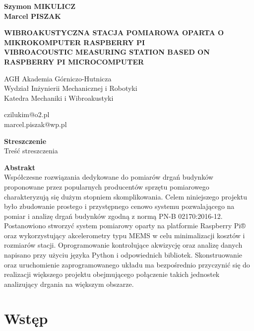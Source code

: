 \documentclass[a4paper,12pt]{mwart}
\begin{document}
\onehalfspacing
\begin{flushleft}

\textbf{Szymon \MakeUppercase{Mikulicz}} \\
\textbf{Marcel \MakeUppercase{Piszak}} \\
\vspace*{12pt}

\MakeUppercase{\textbf{Wibroakustyczna stacja pomiarowa oparta o mikrokomputer Raspberry Pi}} \\
\vspace*{6pt}
\MakeUppercase{\textbf{Vibroacoustic measuring station based on Raspberry Pi microcomputer}} \\
\vspace*{12pt}

AGH Akademia Górniczo-Hutnicza \\
Wydział Inżynierii Mechanicznej i Robotyki \\
Katedra Mechaniki i Wibroakustyki \\
\vspace*{6pt}

czilukim@o2.pl \\
marcel.piszak@wp.pl \\

\end{flushleft}

\noindent
\textbf{Streszczenie} \\
Treść streszczenia
\vspace*{24pt}

\noindent
\textbf{Abstrakt} \\
Współczesne rozwiązania dedykowane do pomiarów drgań budynków
proponowane przez popularnych producentów sprzętu pomiarowego
charakteryzują się dużym stopniem skomplikowania. Celem niniejszego
projektu było zbudowanie prostego i przystępnego cenowo systemu
pozwalającego na pomiar i analizę drgań budynków zgodną z normą PN-B
02170:2016-12. Postanowiono stworzyć system pomiarowy oparty na
platformie Raspberry Pi® oraz wykorzystujący akcelerometry typu MEMS w
celu minimalizacji kosztów i rozmiarów stacji. Oprogramowanie
kontrolujące akwizycję oraz analizę danych napisano przy użyciu języka
Python i odpowiednich bibliotek. Skonstruowanie oraz uruchomienie
zaprogramowanego układu ma bezpośrednio przyczynić się do realizacji
większego projektu obejmującego połączenie takich jednostek analizujący
drgania na większym obszarze.
\vspace*{24pt}


\section{Wstęp}
\end{document}
